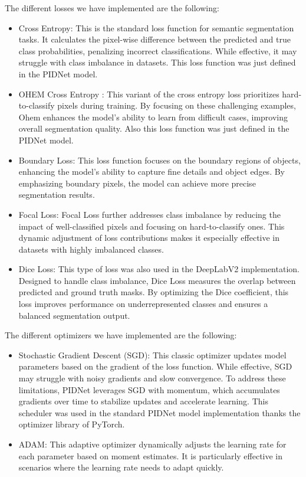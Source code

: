 \documentclass[10pt,twocolumn,letterpaper]{article}
\begin{document}
The different losses we have implemented are the following:
\begin{itemize}
    \item Cross Entropy: This is the standard loss function for semantic segmentation tasks. It calculates the pixel-wise difference between the predicted and true class probabilities, penalizing incorrect classifications. While effective, it may struggle with class imbalance in datasets. This loss function was just defined in the PIDNet model. 
    \item OHEM Cross Entropy : This variant of the cross entropy loss prioritizes hard-to-classify pixels during training. By focusing on these challenging examples, Ohem enhances the model’s ability to learn from difficult cases, improving overall segmentation quality. Also this loss function was just defined in the PIDNet model.
    \item Boundary Loss: This loss function focuses on the boundary regions of objects, enhancing the model’s ability to capture fine details and object edges. By emphasizing boundary pixels, the model can achieve more precise segmentation results. 
    \item Focal Loss:  Focal Loss further addresses class imbalance by reducing the impact of well-classified pixels and focusing on hard-to-classify ones. This dynamic adjustment of loss contributions makes it especially effective in datasets with highly imbalanced classes.
    \item Dice Loss: This type of loss was also used in the DeepLabV2 implementation. Designed to handle class imbalance, Dice Loss measures the overlap between predicted and ground truth masks. By optimizing the Dice coefficient, this loss improves performance on underrepresented classes and ensures a balanced segmentation output.
\end{itemize}

The different optimizers we have implemented are the following:
\begin{itemize}
    \item Stochastic Gradient Descent (SGD): This classic optimizer updates model parameters based on the gradient of the loss function. While effective, SGD may struggle with noisy gradients and slow convergence. To address these limitations, PIDNet leverages SGD with momentum, which accumulates gradients over time to stabilize updates and accelerate learning. This scheduler was used in the standard PIDNet model implementation thanks the optimizer library of PyTorch.
    \item ADAM: This adaptive optimizer dynamically adjusts the learning rate for each parameter based on moment estimates. It is particularly effective in scenarios where the learning rate needs to adapt quickly. 
\end{itemize}
\end{document}
